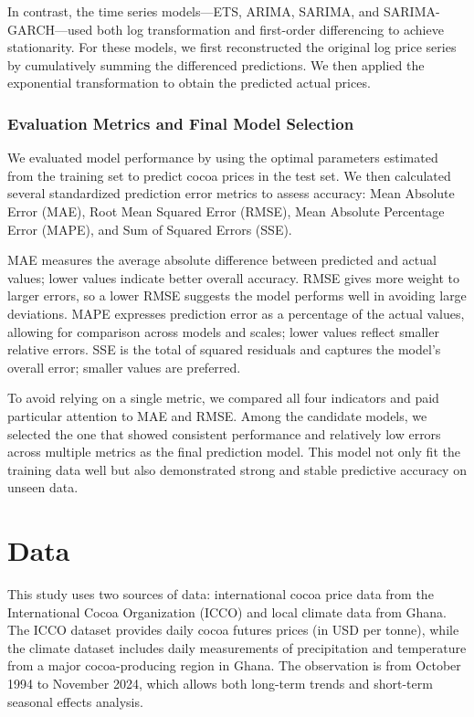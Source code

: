 \documentclass[10pt]{article}
\begin{document}
\noindent
In contrast, the time series models—ETS, ARIMA, SARIMA, and SARIMA-GARCH—used both log transformation and first-order differencing to achieve stationarity. For these models, we first reconstructed the original log price series by cumulatively summing the differenced predictions. We then applied the exponential transformation to obtain the predicted actual prices.

\subsubsection{Evaluation Metrics and Final Model Selection}
We evaluated model performance by using the optimal parameters estimated from the training set to predict cocoa prices in the test set. We then calculated several standardized prediction error metrics to assess accuracy: Mean Absolute Error (MAE), Root Mean Squared Error (RMSE), Mean Absolute Percentage Error (MAPE), and Sum of Squared Errors (SSE).

\noindent
MAE measures the average absolute difference between predicted and actual values; lower values indicate better overall accuracy. RMSE gives more weight to larger errors, so a lower RMSE suggests the model performs well in avoiding large deviations. MAPE expresses prediction error as a percentage of the actual values, allowing for comparison across models and scales; lower values reflect smaller relative errors. SSE is the total of squared residuals and captures the model’s overall error; smaller values are preferred.

\noindent
To avoid relying on a single metric, we compared all four indicators and paid particular attention to MAE and RMSE. Among the candidate models, we selected the one that showed consistent performance and relatively low errors across multiple metrics as the final prediction model. This model not only fit the training data well but also demonstrated strong and stable predictive accuracy on unseen data.

\newpage

\section{Data}
This study uses two sources of data: international cocoa price data from the International Cocoa Organization (ICCO) and local climate data from Ghana. The ICCO dataset provides daily cocoa futures prices (in USD per tonne), while the climate dataset includes daily measurements of precipitation and temperature from a major cocoa-producing region in Ghana. The observation is from October 1994 to November 2024, which allows both long-term trends and short-term seasonal effects analysis.
\end{document}

